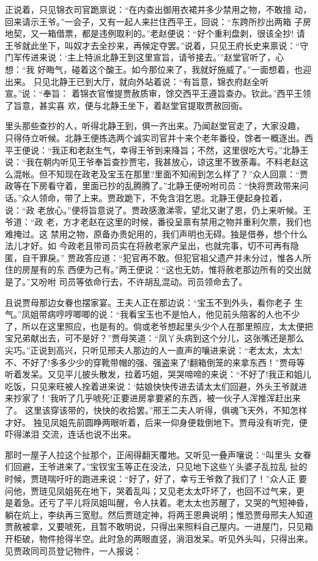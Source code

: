 正说着，只见锦衣司官跪禀说：“在内查出御用衣裙并多少禁用之物，不敢擅
动，回来请示王爷。”一会子，又有一起人来拦住西平王，回说：“东跨所抄出两箱
子房地契，又一箱借票，都是违例取利的。”老赵便说：“好个重利盘剥，很该全抄!
请王爷就此坐下，叫奴才去全抄来，再候定夺罢。”说着，只见王府长史来禀说：“守
门军传进来说：‘主上特派北静王到这里宣旨，请爷接去。’”赵堂官听了，心想：“我
好晦气，碰着这个酸王。如今那位来了，我就好施威了。”一面想着，也迎出来。
只见北静王已到大厅，就向外站着说：“有旨意，锦衣府赵全听宣。”说：“奉旨：
着锦衣官惟提贾赦质审，馀交西平王遵旨查办。钦此。”西平王领了旨意，甚实喜
欢，便与北静王坐下，着赵堂官提取贾赦回衙。

里头那些查抄的人，听得北静王到，俱一齐出来。乃闻赵堂官走了，大家没趣，
只得侍立听候。北静王便拣选两个诚实司官并十来个老年番役，馀者一概逐出。西
平王便说：“我正和老赵生气，幸得王爷到来降旨；不然，这里很吃大亏。”北静王
说：“我在朝内听见王爷奉旨查抄贾宅，我甚放心，谅这里不致荼毒。不料老赵这
么混帐。但不知现在政老及宝玉在那里?里面不知闹到怎么样了？”众人回禀：“贾
政等在下房看守着，里面已抄的乱腾腾了。”北静王便吩咐司员：“快将贾政带来问
话。”众人领命，带了上来。贾政跪下，不免含泪乞恩。北静王便起身拉着，说：“政
老放心。”便将旨意说了。贾政感激涕零，望北又谢了恩，仍上来听候。王爷道：“政
老，方才老赵在这里的时候，番役呈禀有禁用之物并重利欠票，我们也难掩过。这
禁用之物，原备办贵妃用的，我们声明也无碍。独是借券，想个什么法儿才好。如
今政老且带司员实在将赦老家产呈出，也就完事，切不可再有隐匿，自干罪戾。”
贾政答应道：“犯官再不敢。但犯官祖父遗产并未分过，惟各人所住的房屋有的东
西便为己有。”两王便说：“这也无妨，惟将赦老那边所有的交出就是了。”又吩咐
司员等依命行去，不许胡乱混动。司员领命去了。

且说贾母那边女眷也摆家宴。王夫人正在那边说：“宝玉不到外头，看你老子
生气。”凤姐带病哼哼唧唧的说：“我看宝玉也不是怕人，他见前头陪客的人也不少
了，所以在这里照应，也是有的。倘或老爷想起里头少个人在那里照应，太太便把
宝兄弟献出去，可不是好？”贾母笑道：“凤丫头病到这个分儿，这张嘴还是那么
尖巧。”正说到高兴，只听见邢夫人那边的人一直声的嚷进来说：“老太太，太太!
不、不好了!多多少少的穿靴带帽的强、强盗来了!翻箱倒笼的来拿东西！”贾母等
听着发呆。又见平儿披头散发，拉着巧姐，哭哭啼啼的来说：“不好了!我正和姐儿
吃饭，只见来旺被人拴着进来说：‘姑娘快快传进去请太太们回避，外头王爷就进
来抄家了！’我听了几乎唬死!正要进房拿要紧的东西，被一伙子人浑推浑赶出来了。
这里该穿该带的，快快的收拾罢。”邢王二夫人听得，俱魂飞天外，不知怎样才好。
独见凤姐先前圆睁两眼听着，后来一仰身便栽倒地下。贾母没有听完，便吓得涕泪
交流，连话也说不出来。

那时一屋子人拉这个扯那个，正闹得翻天覆地。又听见一叠声嚷说：“叫里头
女眷们回避，王爷进来了。”宝钗宝玉等正在没法，只见地下这些丫头婆子乱拉乱
扯的时候，贾琏喘吁吁的跑进来说：“好了，好了，幸亏王爷救了我们了！”众人正
要问他，贾琏见凤姐死在地下，哭着乱叫；又见老太太吓坏了，也回不过气来，更
是着急。还亏了平儿将凤姐叫醒，令人扶着。老太太也苏醒了，又哭的气短神昏，
躺在炕上，李纨再三宽慰。然后贾琏定神，将两王恩典说明；惟恐贾母邢夫人知道
贾赦被拿，又要唬死，且暂不敢明说，只得出来照料自己屋内。一进屋门，只见箱
开柜破，物件抢得半空。此时急的两眼直竖，淌泪发呆。听见外头叫，只得出来。
见贾政同司员登记物件，一人报说：

